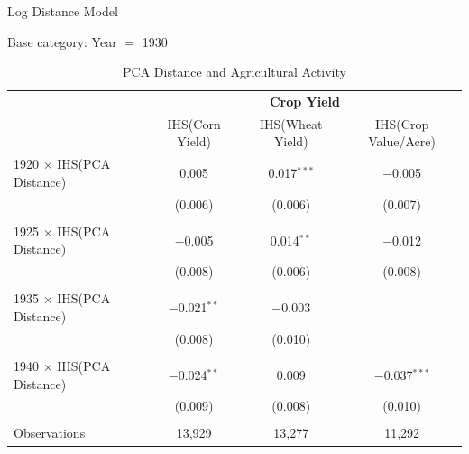\documentclass[12pt]{article}
\begin{document}
\begin{table}\centering
    \caption{PCA Distance and Agricultural Activity}
    \label{log-log}
Log Distance Model

\footnotesize   
\vspace{.5cm} 
Base category: Year $=$ 1930
\def\sym#1{\ifmmode^{#1}\else\(^{#1}\)\fi}

\begin{threeparttable}[t]
\begin{tabular}{l*{3}{c}}
    \hline\hline
 & \multicolumn{3}{c}{\textbf{Crop Yield}} \\

                    &\multicolumn{1}{c}{IHS(Corn Yield)}&\multicolumn{1}{c}{IHS(Wheat Yield)}&\multicolumn{1}{c}{IHS(Crop Value/Acre)} \\
\hline
1920 $\times$ IHS(PCA Distance)& 0.005          & 0.017$^{***}$& $-$0.005             \\
                               & (0.006)        & (0.006)      & (0.007)              \\
                               &                &              &                      \\
1925 $\times$ IHS(PCA Distance)& $-$0.005       & 0.014$^{**}$ & $-$0.012             \\
                               & (0.008)        & (0.006)      & (0.008)              \\
                               &                &              &                      \\
1935 $\times$ IHS(PCA Distance)& $-$0.021$^{**}$& $-$0.003     &                      \\
                               & (0.008)        & (0.010)      &                      \\
                               &                &              &                      \\
1940 $\times$ IHS(PCA Distance)& $-$0.024$^{**}$& 0.009        & $-$0.037$^{***}$     \\
                               & (0.009)        & (0.008)      & (0.010)              \\
                               &                &              &                      \\
\hline
Observations                           &     13,929 & 13,277 & 11,292                   \\

\end{tabular}
\end{threeparttable}
\end{table}
\end{document}
